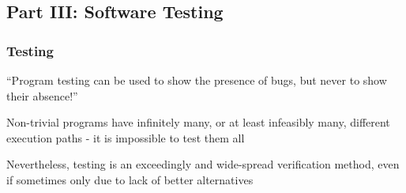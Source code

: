 \subsection{Part III: Software Testing}
\subsubsection*{Testing}
\enquote{Program testing can be used to show the presence of bugs, but never to show their absence!}
\begin{defBox}[title=Why is that so?]
    Non-trivial programs have infinitely many, or at least infeasibly many, different execution paths - it is impossible to test them all
\end{defBox}
\begin{defBox}
    Nevertheless, testing is an exceedingly  and wide-spread verification method, even if sometimes only due to lack of better alternatives
\end{defBox}

